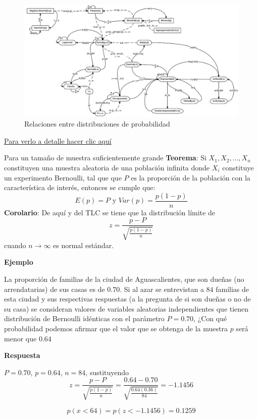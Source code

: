 \documentclass[
  10pt,
  ignorenonframetext,
]{beamer}
\begin{document}
\begin{frame}{}
\protect\hypertarget{section-23}{}
\begin{figure}
\centering
\includegraphics[width=1\textwidth,height=\textheight]{figuras/1280px-Relationships_among_some_of_univariate_probability_distributions.jpg}
\caption{Relaciones entre distribuciones de probabilidad}
\end{figure}

\href{https://en.wikipedia.org/wiki/Relationships_among_probability_distributions\#/media/File:Relationships_among_some_of_univariate_probability_distributions.jpg}{Para
verlo a detalle hacer clic aquí}
\end{frame}

\begin{frame}{}
\protect\hypertarget{section-24}{}
\begin{block}{Para un tamaño de muestra suficientemente grande}
\protect\hypertarget{para-un-tamauxf1o-de-muestra-suficientemente-grande}{}
\textbf{Teorema}: Si \(X_1, X_2, \ldots, X_n\) constituyen una muestra
aleatoria de una población infinita donde \(X_i\) constituye un
experimento Bernoulli, tal que que \(P\) es la proporción de la
población con la característica de interés, entonces se cumple que:
\[E(p)=P \mbox{ y } Var(p)=\frac{p(1-p)}{n}\] \textbf{Corolario}: De
aquí y del TLC se tiene que la distribución límite de
\[z=\frac{p-P}{\sqrt{\frac{p(1-p)}{n}}}\] cuando \(n \to \infty\) es
normal estándar.
\end{block}
\end{frame}

\begin{frame}{}
\protect\hypertarget{section-25}{}
\textbf{Ejemplo}

La proporción de familias de la ciudad de Aguascalientes, que son dueñas
(no arrendatarias) de sus casas es de \(0.70\). Si al azar se
entrevistan a \(84\) familias de esta ciudad y sus respectivas
respuestas (a la pregunta de si son dueñas o no de su casa) se
consideran valores de variables aleatorias independientes que tienen
distribución de Bernoulli idénticas con el parámetro \(P = 0.70\), ¿Con
qué probabilidad podemos afirmar que el valor que se obtenga de la
muestra \(p\) será menor que \(0.64\)

\textbf{Respuesta}

\(P = 0.70\), \(p = 0.64\), \(n = 84\), sustituyendo
\[z=\frac{p-P}{\sqrt{\frac{p(1-p)}{n}}}=\frac{0.64-0.70}{\sqrt{\frac{0.64(0.36)}{84}}}= -1.1456\]

\[p(x<64)=p(z< -1.1456)=0.1259\]
\end{frame}
\end{document}
